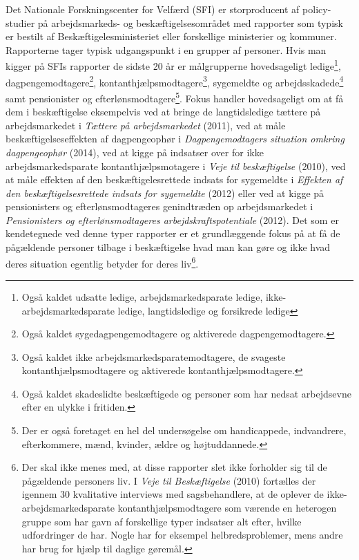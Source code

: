 Det Nationale Forskningscenter for Velfærd (SFI) er storproducent af policy-studier på arbejdsmarkeds- og beskæftigelsesområdet med rapporter som typisk er bestilt af Beskæftigelesministeriet eller forskellige ministerier og kommuner. Rapporterne tager typisk udgangspunkt i en grupper af personer. Hvis man kigger på SFIs rapporter de sidste 20 år er målgrupperne hovedsageligt ledige\footnote{Også kaldet udsatte ledige, arbejdsmarkedsparate ledige, ikke-arbejdsmarkedsparate ledige, langtidsledige og forsikrede ledige}, dagpengemodtagere\footnote{Også kaldet sygedagpengemodtagere og aktiverede dagpengemodtagere.}, kontanthjælpsmodtagere\footnote{Også kaldet ikke arbejdsmarkedsparatemodtagere, de svageste kontanthjælpsmodtagere og aktiverede kontanthjælpsmodtagere.}, sygemeldte og arbejdsskadede\footnote{Også kaldet skadeslidte beskæftigede og personer som har nedsat arbejdsevne efter en ulykke i fritiden.} samt pensionister og efterlønsmodtagere\footnote{Der er også foretaget en hel del undersøgelse om handicappede, indvandrere, efterkommere, mænd, kvinder, ældre og højtuddannede.}. Fokus handler hovedsageligt om at få dem i beskæftigelse eksempelvis ved at bringe de langtidsledige tættere på arbejdsmarkedet i \textit{Tættere på arbejdsmarkedet} (2011), ved at måle beskæftigelseseffekten af dagpengeophør i \textit{Dagpengemodtagers situation omkring dagpengeophør} (2014), ved at kigge på indsatser over for ikke arbejdsmarkedsparate kontanthjælpsmotagere i \textit{Veje til beskæftigelse} (2010), ved at måle effekten af den beskæftigelesrettede indsats for sygemeldte i \textit{Effekten af den beskæftigelsesrettede indsats for sygemeldte} (2012) eller ved at kigge på pensionisters og efterlønsmodtageres genindtræden op arbejdsmarkedet i \textit{Pensionisters og efterlønsmodtageres arbejdskraftspotentiale} (2012). Det som er kendetegnede ved denne typer rapporter er et grundlæggende fokus på at få de pågældende personer tilbage i beskæftigelse hvad man kan gøre og ikke hvad deres situation egentlig betyder for deres liv\footnote{Der skal ikke menes med, at disse rapporter slet ikke forholder sig til de pågældende personers liv. I \textit{Veje til Beskæftigelse} (2010) fortælles der igennem 30 kvalitative interviews med sagsbehandlere, at de oplever de ikke-arbejdsmarkedsparate kontanthjælpsmodtagere som værende en heterogen gruppe som har gavn af forskellige typer indsatser alt efter, hvilke udfordringer de har. Nogle har for eksempel helbredsproblemer, mens andre har brug for hjælp til daglige gøremål.}.





